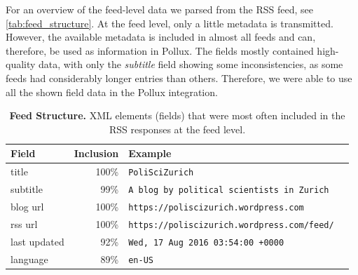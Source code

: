 \documentclass{article}
\begin{document}
For an overview of the feed-level data we parsed from the RSS feed, see \autoref{tab:feed_structure}.
At the feed level, only a little metadata is transmitted. However, the available metadata is included in almost all feeds and can, therefore, be used as information in Pollux. The fields mostly contained high-quality data, with only the \textit{subtitle} field showing some inconsistencies, as some feeds had considerably longer entries than others. Therefore, we were able to use all the shown field data in the Pollux integration.
\begin{table}[htb]
    \caption{\textbf{Feed Structure.} XML elements (fields) that were most often included in the RSS responses at the feed level.}
    \centering
    \begin{tabular}{lrl}
        \toprule
        \cmidrule(r){1-2}
        \textbf{Field} & \textbf{Inclusion} & \textbf{Example}                                   \\
        \midrule
        title          & 100\%              & \verb|PoliSciZurich                              | \\
        subtitle       & 99\%               & \verb|A blog by political scientists in Zurich   | \\
        blog url       & 100\%              & \verb|https://poliscizurich.wordpress.com        | \\
        rss url        & 100\%              & \verb|https://poliscizurich.wordpress.com/feed/  | \\
        last updated   & 92\%               & \verb|Wed, 17 Aug 2016 03:54:00 +0000            | \\
        language       & 89\%               & \verb|en-US|                                       \\
        \bottomrule
    \end{tabular}
    \label{tab:feed_structure}
\end{table}
\end{document}
